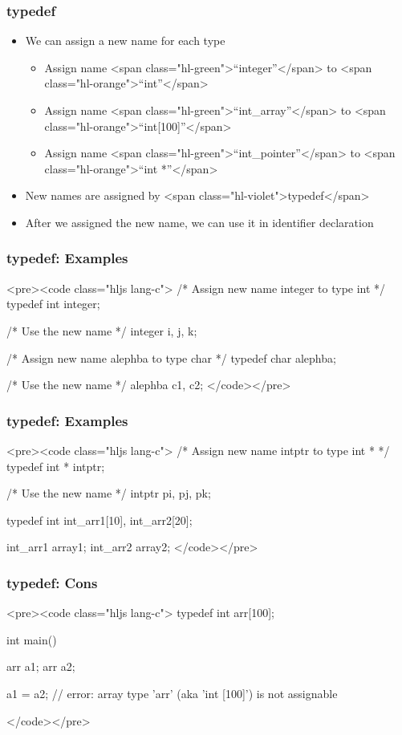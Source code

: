 \documentclass{../c-lecture}
\begin{document}
\begin{frame}
  \frametitle{typedef}
  \begin{itemize}
    \item We can assign a new name for each type
    \begin{itemize}
      \item
        Assign name <span class="hl-green">“integer”</span> to
        <span class="hl-orange">“int”</span>

      \item
        Assign name <span class="hl-green">“int_array”</span> to
        <span class="hl-orange">“int[100]”</span>

      \item
        Assign name <span class="hl-green">“int_pointer”</span> to
        <span class="hl-orange">“int *”</span>

    \end{itemize}
    \item New names are assigned by <span class="hl-violet">typedef</span>
    \item
      After we assigned the new name, we can use it in identifier declaration

  \end{itemize}
\end{frame}
\begin{frame}
  \frametitle{typedef: Examples}
  <pre><code class="hljs lang-c">
/* Assign new name integer to type int */
typedef int integer;

/* Use the new name */
integer i, j, k;

/* Assign new name alephba to type char */
typedef char alephba;

/* Use the new name */
alephba c1, c2;
  </code></pre>
\end{frame}
\begin{frame}
  \frametitle{typedef: Examples}
  <pre><code class="hljs lang-c">
/* Assign new name intptr to type int * */
typedef int * intptr;

/* Use the new name */
intptr pi, pj, pk;

typedef int int_arr1[10], int_arr2[20];

int_arr1 array1;
int_arr2 array2;
  </code></pre>
\end{frame}
\begin{frame}
  \frametitle{typedef: Cons}
  <pre><code class="hljs lang-c">
typedef int arr[100];

int main() {
  arr a1;
  arr a2;

  a1 = a2; // error: array type 'arr' (aka 'int [100]') is not assignable
}
  </code></pre>
\end{frame}
\end{document}

